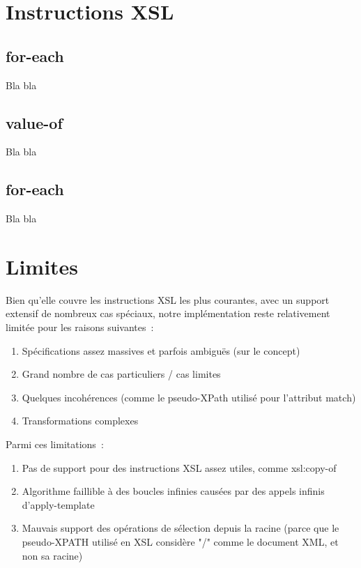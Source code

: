 \section{Instructions XSL}

    \subsection{for-each}
        Bla bla

    \subsection{value-of}
        Bla bla

    \subsection{for-each}
        Bla bla

\section{Limites}

Bien qu'elle couvre les instructions XSL les plus courantes, avec un support extensif de nombreux cas spéciaux,
notre implémentation reste relativement limitée pour les raisons suivantes~:

\begin{enumerate}
    \item Spécifications assez massives et parfois ambiguës (sur le concept)
    \item Grand nombre de cas particuliers / cas limites
    \item Quelques incohérences (comme le pseudo-XPath utilisé pour l'attribut match)
    \item Transformations complexes
\end{enumerate}

Parmi ces limitations~:

\begin{enumerate}
    \item Pas de support pour des instructions XSL assez utiles, comme xsl:copy-of
    \item Algorithme faillible à des boucles infinies causées par des appels infinis d'apply-template
    \item Mauvais support des opérations de sélection depuis la racine (parce que le pseudo-XPATH utilisé en XSL considère "/" comme le document XML, et non sa racine)
\end{enumerate}
